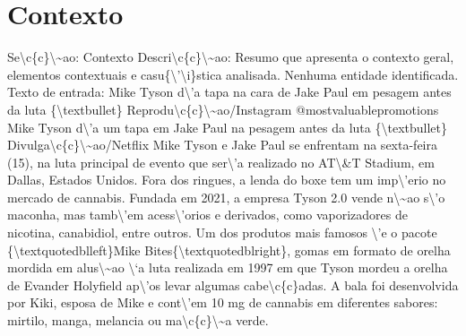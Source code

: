 \documentclass{article}%
\begin{document}
\section{Contexto}%
\label{sec:Contexto}%
Se\textbackslash{}c\{c\}\textbackslash{}\textasciitilde{}ao: Contexto\newline%
Descri\textbackslash{}c\{c\}\textbackslash{}\textasciitilde{}ao: Resumo que apresenta o contexto geral, elementos contextuais e casu\{\textbackslash{}'\textbackslash{}i\}stica analisada.\newline%
\newline%
Nenhuma entidade identificada.\newline%
\newline%
Texto de entrada:\newline%
Mike Tyson d\textbackslash{}'a tapa na cara de Jake Paul em pesagem antes da luta\newline%
\{\textbackslash{}textbullet\} Reprodu\textbackslash{}c\{c\}\textbackslash{}\textasciitilde{}ao/Instagram @mostvaluablepromotions\newline%
\newline%
Mike Tyson d\textbackslash{}'a um tapa em Jake Paul na pesagem antes da luta\newline%
\{\textbackslash{}textbullet\} Divulga\textbackslash{}c\{c\}\textbackslash{}\textasciitilde{}ao/Netflix\newline%
\newline%
Mike Tyson e Jake Paul se enfrentam na sexta{-}feira (15), na luta principal de evento que ser\textbackslash{}'a realizado no AT\textbackslash{}\&T Stadium, em Dallas, Estados Unidos. Fora dos ringues, a lenda do boxe tem um imp\textbackslash{}'erio no mercado de cannabis.\newline%
\newline%
Fundada em 2021, a empresa Tyson 2.0 vende n\textbackslash{}\textasciitilde{}ao s\textbackslash{}'o maconha, mas tamb\textbackslash{}'em acess\textbackslash{}'orios e derivados, como vaporizadores de nicotina, canabidiol, entre outros. Um dos produtos mais famosos \textbackslash{}'e o pacote \{\textbackslash{}textquotedblleft\}Mike Bites\{\textbackslash{}textquotedblright\}, gomas em formato de orelha mordida em alus\textbackslash{}\textasciitilde{}ao \textbackslash{}`a luta realizada em 1997 em que Tyson mordeu a orelha de Evander Holyfield ap\textbackslash{}'os levar algumas cabe\textbackslash{}c\{c\}adas.\newline%
\newline%
A bala foi desenvolvida por Kiki, esposa de Mike e cont\textbackslash{}'em 10 mg de cannabis em diferentes sabores: mirtilo, manga, melancia ou ma\textbackslash{}c\{c\}\textbackslash{}\textasciitilde{}a verde.\newline%
\end{document}
